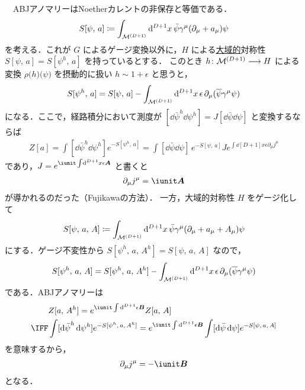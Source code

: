 \documentclass[TQFT_main]{subfiles}
\begin{document}
\begin{description}
    　ABJアノマリーはNoetherカレントの非保存と等価である．
    \begin{align}
        S[\psi,\, a] \coloneqq \int_{\mathcal{M}^{(D+1)}} \dd[D+1]{x} \bar{\psi} \gamma^\mu (\partial_\mu + a_\mu) \psi
    \end{align}
    を考える．これが $G$ によるゲージ変換以外に，$H$ による\underline{大域的}対称性 $S[\psi,\, a] = S[\psi^h,\, a]$ を持っているとする．
    このとき $h \colon \mathcal{M}^{(D+1)} \longrightarrow H$ による変換 $\rho\bigl(h\bigr)\bigl(\psi\bigr)$ を摂動的に扱い $h \sim 1 + \epsilon$ と思うと，
    \begin{align}
        S[\psi^h,\, a] = S[\psi,\, a] - \int_{\mathcal{M}^{(D+1)}} \dd[D+1]{x} \epsilon\, \partial_\mu (\overline{\psi} \gamma^\mu \psi)
    \end{align}
    になる．ここで，経路積分において測度が $[\dd{\bar{\psi}}^h \dd{\psi}^h] = J [\dd{\bar{\psi}} \dd{\psi}]$ と変換するならば
    \begin{align}
        Z[a] = \int [\dd{\bar{\psi}^h} \dd{\psi^h}] e^{-S[\psi^h,\, a]} = \int [\dd{\bar{\psi}} \dd{\psi}]\, e^{-S[\psi,\, a]} J e^{\int \dd[D+1]{x} \epsilon \partial_\mu j^\mu}
    \end{align}
    であり，$J = e^{\iunit \int \dd[D+1]{x} \epsilon \bm{A}}$ と書くと
    \begin{align}
        \partial_\mu j^\mu = \iunit \bm{A}
    \end{align}
    が導かれるのだった（Fujikawaの方法）．
    一方，大域的対称性 $H$ をゲージ化して
    \begin{align}
        S[\psi,\, a,\, A] \coloneqq \int_{\mathcal{M}^{(D+1)}} \dd[D+1]{x} \bar{\psi} \gamma^\mu (\partial_\mu + a_\mu + A_\mu) \psi 
    \end{align}
    にする．ゲージ不変性から $S[\psi^h,\, a,\, A^h] = S[\psi,\, a,\, A]$ なので，
    \begin{align}
        S[\psi^h,\, a,\, A] = S[\psi^h,\, a,\, A^h] - \int_{\mathcal{M}^{(D+1)}} \dd[D+1]{x} \epsilon\, \partial_\mu (\overline{\psi} \gamma^\mu \psi)
    \end{align}
    である．ABJアノマリーは
    \begin{align}
        &Z[a,\, A^h] = e^{\iunit \int \dd[D+1] \epsilon \bm{B}} Z[a,\, A] \\
        \IFF &\int [\dd{\bar{\psi}}^h \dd{\psi}^h] e^{-S[\psi^h,\, a,\, A^h]} = e^{\iunit \int \dd[D+1] \epsilon \bm{B}} \int [\dd{\bar{\psi}} \dd{\psi}] e^{-S[\psi,\, a,\, A]}
    \end{align}
    を意味するから，
    \begin{align}
        \partial_\mu j^\mu = -\iunit \bm{B}
    \end{align}
    となる．
\end{description}
\end{document}
